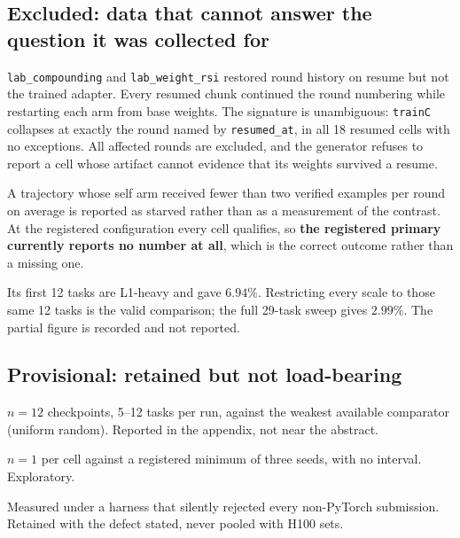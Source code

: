 \subsection{Excluded: data that cannot answer the question it was collected for}

\begin{description}[leftmargin=1.4em,style=nextline]
\item[{Severed trajectories (Amendment 5).}]
  \texttt{lab\_compounding} and \texttt{lab\_weight\_rsi} restored round history on resume but not
  the trained adapter. Every resumed chunk continued the round numbering while restarting each
  arm from base weights. The signature is unambiguous: \texttt{trainC} collapses at exactly the
  round named by \texttt{resumed\_at}, in all 18 resumed cells with no exceptions. All affected
  rounds are excluded, and the generator refuses to report a cell whose artifact cannot evidence
  that its weights survived a resume.

\item[{Starved trajectories (Amendment 6).}]
  A trajectory whose self arm received fewer than two verified examples per round on average is
  reported as starved rather than as a measurement of the contrast. At the registered
  configuration every cell qualifies, so \textbf{the registered primary currently reports no
  number at all}, which is the correct outcome rather than a missing one.

\item[{The 32B probe's first reading.}]
  Its first 12 tasks are L1-heavy and gave $6.94\%$. Restricting every scale to those same 12
  tasks is the valid comparison; the full 29-task sweep gives $2.99\%$. The partial figure is
  recorded and not reported.
\end{description}

\subsection{Provisional: retained but not load-bearing}

\begin{description}[leftmargin=1.4em,style=nextline]
\item[{Probe-as-intervention ($+0.124\,[+0.029,+0.218]$).}]
  $n=12$ checkpoints, 5--12 tasks per run, against the weakest available comparator (uniform
  random). Reported in the appendix, not near the abstract.

\item[{T4 closed$\to$open.}]
  $n = 1$ per cell against a registered minimum of three seeds, with no interval. Exploratory.

\item[{Any A100 speed-scored board.}]
  Measured under a harness that silently rejected every non-PyTorch submission. Retained with the
  defect stated, never pooled with H100 sets.
\end{description}

